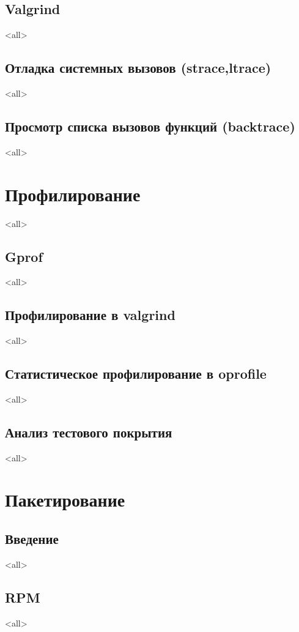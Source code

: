 \section{Valgrind}
\mode<all>{}
\section{Отладка системных вызовов (strace,ltrace)}
\mode<all>{}
\section{Просмотр списка вызовов функций (backtrace)}
\mode<all>{}

\chapter{Профилирование}
\mode<all>{}
\section{Gprof}
\mode<all>{}
\section{Профилирование в valgrind}
\mode<all>{}
\section[oprofile]{Статистическое профилирование в oprofile}
\mode<all>{}
\section{Анализ тестового покрытия}
\mode<all>{}

\chapter{Пакетирование}
\section{Введение}
\mode<all>{}
\section{RPM}
\mode<all>{}

